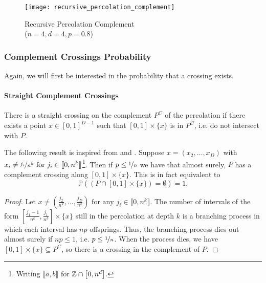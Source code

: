 \begin{figure}[!h]
	\centering
	\texttt{[image: recursive\_percolation\_complement]}
	\caption{Recursive Percolation Complement\\($n=4, d=4, p=0.8$)}
	\label{fig:recursivePercolationComplement}
\end{figure}

\subsubsection{Complement Crossings Probability}
Again, we will first be interested in the probability that a crossing exists.

\paragraph{Straight Complement Crossings}
There is a straight crossing on the complement $P^C$ of the percolation if there exists a point $x \in \left[ 0,1 \right]^{D-1}$ such that $\left[ 0,1 \right] \times \{ x \}$  is in $P^C$, i.e. do not intersect with $P$.

The following result is inspired from \cite[p.309 b.(1)]{Chayes_1988} and \cite[p.215]{Mandelbrot_1982}.
Suppose $x = (x_2,\dots,x_D)$ with $x_i \neq \nicefrac{j_i}{n^k} \text{ for } j_i \in \llbracket 0,n^k \rrbracket$\footnote{Writing $\llbracket a,b \rrbracket$ for $\mathbb{Z} \cap \left[ 0,n^d \right]$.}.
Then if $p \leq \nicefrac{1}{n}$ we have that almost surely, $P$ has a complement crossing along $\left[ 0,1 \right] \times \{ x \}$.
This is in fact equivalent to 
$$\mathbb{P}\left( \left( P \cap \left[ 0,1 \right] \times \{ x \} \right) = \emptyset \right) = 1 .$$
\begin{proof}
	Let $x \neq \left( \frac{j_2}{n^k},\dots,\frac{j_D}{n^k} \right) \text{ for any } j_i \in \llbracket 0,n^k \rrbracket$.
	The number of intervals of the form $\left[ \frac{j_1-1}{n^k},\frac{j_1}{n^k} \right] \times \{ x \}$ still in the percolation at depth $k$ is a branching process in which each interval has $np$ offsprings.
	Thus, the branching process dies out almost surely if $np \leq 1$, i.e. $p \leq \nicefrac{1}{n}$.
	When the process dies, we have $\left[ 0,1 \right] \times \{ x \} \subseteq P^C$, so there is a crossing in the complement of $P$.
\end{proof}

